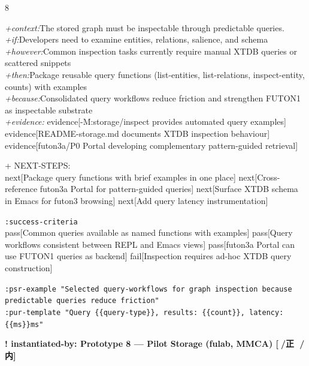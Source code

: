 \documentclass[landscape]{article}
\newcommand{\flexitag}[1]{\textcolor[gray]{0.35}{\textit{#1}}}
\newenvironment{devmapgreenfield}{%
  \def\FrameCommand{\colorbox{devmapgreenfieldbg}}%
  \setlength{\fboxsep}{2pt}%
  \MakeFramed{\advance\hsize-\width \FrameRestore}%
}{\endMakeFramed}
\begin{document}
\begin{paracol}{8}
\begin{devmapgreenfield}
  \flexitag{+context:}The stored graph must be inspectable through predictable queries.\\
  \flexitag{+if:}Developers need to examine entities, relations, salience, and schema\\
  \flexitag{+however:}Common inspection tasks currently require manual XTDB queries or scattered snippets\\
  \flexitag{+then:}Package reusable query functions (list-entities, list-relations, inspect-entity, counts) with examples\\
  \flexitag{+because:}Consolidated query workflows reduce friction and strengthen FUTON1 as inspectable substrate\\
  \flexitag{+evidence:} evidence[-M:storage/inspect provides automated query examples] evidence[README-storage.md documents XTDB inspection behaviour] evidence[futon3a/P0 Portal developing complementary pattern-guided retrieval]\\
\par
  + NEXT-STEPS:\\
    next[Package query functions with brief examples in one place] next[Cross-reference futon3a Portal for pattern-guided queries] next[Surface XTDB schema in Emacs for futon3 browsing] next[Add query latency instrumentation]\\
\par
  \texttt{:\allowbreak{}success-\allowbreak{}criteria}\\
    pass[Common queries available as named functions with examples] pass[Query workflows consistent between REPL and Emacs views] pass[futon3a Portal can use FUTON1 queries as backend] fail[Inspection requires ad-hoc XTDB query construction]\\
\par
  \texttt{:\allowbreak{}psr-\allowbreak{}example "Selected query-\allowbreak{}workflows for graph inspection because predictable queries reduce friction"}\\
  \texttt{:\allowbreak{}pur-\allowbreak{}template "Query \{\{query-\allowbreak{}type\}\},\allowbreak{} results:\allowbreak{} \{\{count\}\},\allowbreak{} latency:\allowbreak{} \{\{ms\}\}ms"}\\
\par
\par
\end{devmapgreenfield}
\begin{devmapgreenfield}
\textbf{! instantiated-by: Prototype 8 — Pilot Storage (fulab, MMCA) [🎑/正 🍵/内]}\\

\end{devmapgreenfield}
\end{paracol}
\end{document}
